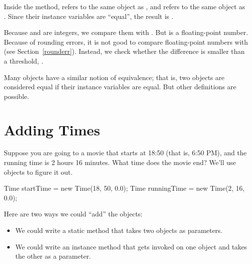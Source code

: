Inside the  method,  refers to the same object as , and  refers to the same object as .
Since their instance variables are ``equal'', the result is .

Because  and  are integers, we compare them with \java{==}.  
But  is a floating-point number.  
Because of rounding errors, it is not good to compare floating-point numbers with \java{==} (see Section~\ref{rounderr}).
Instead, we check whether the difference is smaller than a threshold, .

Many objects have a similar notion of equivalence; that is, two objects are considered equal if their instance variables are equal.
But other definitions are possible.



%
%


\section{Adding Times}

Suppose you are going to a movie that starts at 18:50 (that is, 6:50 PM), and the running time is 2 hours 16 minutes.
What time does the movie end?
We'll use  objects to figure it out.

\begin{code}
Time startTime = new Time(18, 50, 0.0);
Time runningTime = new Time(2, 16, 0.0);
\end{code}


Here are two ways we could ``add'' the  objects:

\begin{itemize}

\item We could write a static method that takes two  objects as parameters.

\item We could write an instance method that gets invoked on one object and takes the other as a parameter.

\end{itemize}

